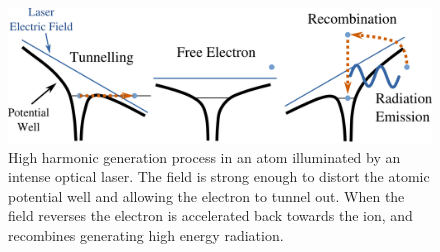 \begin{figure}[h]
\centering
  \includegraphics[width=1.0 \columnwidth]{HHG_Picture1.png}
  \caption{High harmonic generation process in an atom illuminated by an intense
    optical laser. The field is strong enough to distort the atomic potential
    well and allowing the electron to tunnel out. When the field reverses the
    electron is accelerated back towards the ion, and recombines generating high
    energy radiation.}
  \label{Fig:HHG_Process}
\end{figure}


